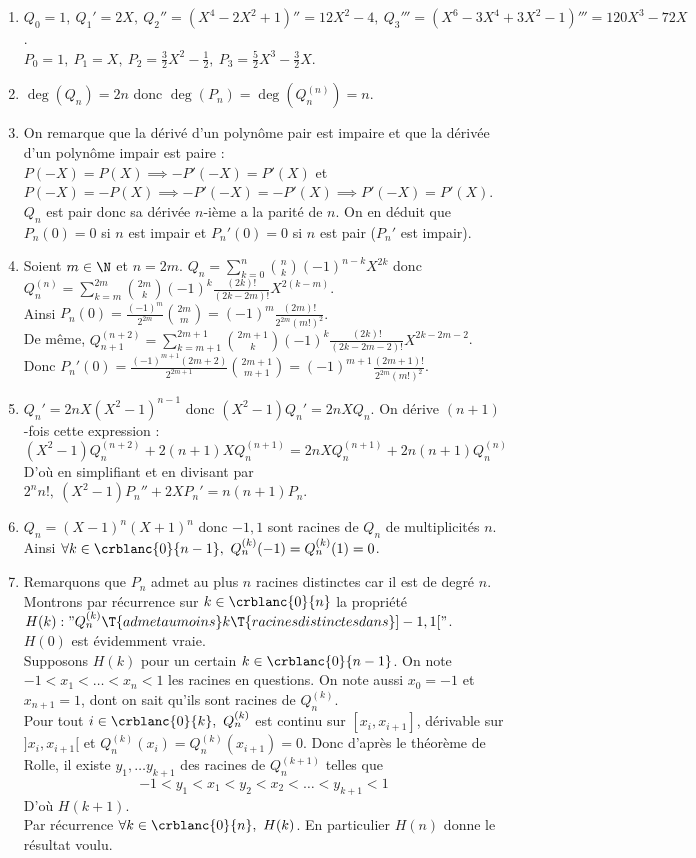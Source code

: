 \documentclass{book}
\begin{document}
	\begin{enumerate}[leftmargin=*]
		\item $Q_0=1,\ Q_1'=2X,\ Q_2''=(X^4-2X^2+1)''=12X^2-4,\ Q_3'''=(X^6-3X^4+3X^2-1)'''=120X^3-72X$.\\
		$P_0=1,\ P_1=X,\ P_2=\displaystyle\frac{3}{2}X^2-\frac{1}{2},\ P_3=\frac{5}{2}X^3-\frac{3}{2}X$.
		\item $\deg(Q_n)=2n$ donc $\deg(P_n)=\deg(Q_n^{(n)})=n$.
		\item On remarque que la dérivé d'un polynôme pair est impaire et que la dérivée d'un polynôme impair est paire : $P(-X)=P(X)\implies -P'(-X)=P'(X)$ et $P(-X)=-P(X)\implies -P'(-X)=-P'(X)\implies P'(-X)=P'(X)$.\\
		$Q_n$ est pair donc sa dérivée $n$-ième a la parité de $n$. On en déduit que $P_n(0)=0$ si $n$ est impair et $P_n'(0)=0$ si $n$ est pair ($P_n'$ est impair).
		\item Soient $m\in \N$ et $n=2m$. $Q_n=\displaystyle\sum_{k=0}^n\binom{n}{k}(-1)^{n-k}X^{2k}$ donc $Q_n^{(n)}=\displaystyle\sum_{k=m}^{2m}\binom{2m}{k}(-1)^k\frac{(2k)!}{(2k-2m)!}X^{2(k-m)}$.\\
		Ainsi $P_n(0)=\displaystyle\frac{(-1)^m}{2^{2m}}\binom{2m}{m}=(-1)^m\frac{(2m)!}{2^{2m}(m!)^2}$.\\
		De même, $Q_{n+1}^{(n+2)}=\displaystyle\sum_{k=m+1}^{2m+1}\binom{2m+1}{k}(-1)^k\frac{(2k)!}{(2k-2m-2)!}X^{2k-2m-2}$.\\
		Donc $P_n'(0)=\displaystyle\frac{(-1)^{m+1}(2m+2)}{2^{2m+1}}\binom{2m+1}{m+1}=(-1)^{m+1}\frac{(2m+1)!}{2^{2m}(m!)^2}$.
		\item $Q_n'=2nX(X^2-1)^{n-1}$ donc $(X^2-1)Q_n'=2nXQ_n$. On dérive $(n+1)$-fois cette expression :
		$$(X^2-1)Q_n^{(n+2)}+2(n+1)XQ_n^{(n+1)}=2nXQ_n^{(n+1)}+2n(n+1)Q_n^{(n)}$$
		D'où en simplifiant et en divisant par $2^nn!,\ (X^2-1)P_n''+2XP_n'=n(n+1)P_n$.
		\item $Q_n=(X-1)^n(X+1)^n$ donc $-1,1$ sont racines de $Q_n$ de multiplicités $n$. Ainsi $\forall k\in \crblanc{0}{n-1},\ Q_n^{(k)}(-1)=Q_n^{(k)}(1)=0$.
		\item Remarquons que $P_n$ admet au plus $n$ racines distinctes car il est de degré $n$.\\
		Montrons par récurrence sur $k\in \crblanc{0}{n}$ la propriété $H(k):"Q_n^{(k)}\T{ admet au moins }k\T{ racines distinctes dans }]-1,1["$.\\
		$H(0)$ est évidemment vraie.\\
		Supposons $H(k)$ pour un certain $k\in \crblanc{0}{n-1}$. On note $-1<x_1<\dots<x_n<1$ les racines en questions. On note aussi $x_0=-1$ et $x_{n+1}=1$, dont on sait qu'ils sont racines de $Q_n^{(k)}$.\\
		Pour tout $i\in \crblanc{0}{k},\ Q_n^{(k)}$ est continu sur $[x_i,x_{i+1}]$, dérivable sur $]x_i,x_{i+1}[$ et $Q_n^{(k)}(x_i)=Q_n^{(k)}(x_{i+1})=0$. Donc d'après le théorème de Rolle, il existe $y_1,\dots y_{k+1}$ des racines de $Q_n^{(k+1)}$ telles que
		$$-1<y_1<x_1<y_2<x_2<\dots<y_{k+1}<1$$
		D'où $H(k+1)$.\\
		Par récurrence $\forall k\in \crblanc{0}{n},\ H(k)$. En particulier $H(n)$ donne le résultat voulu.
	\end{enumerate}
	
\end{document}

